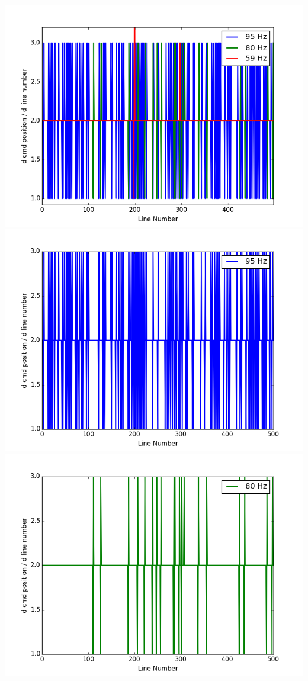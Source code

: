 \documentclass[12pt]{article}
\begin{document}
\includegraphics[scale=.7]{cmd_lno_all.png}
\includegraphics[scale=.7]{cmd_lno_95.png}
\includegraphics[scale=.7]{cmd_lno_80.png}
\end{document}
